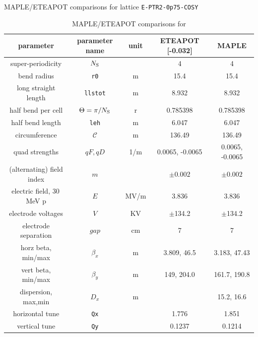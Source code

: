 \documentclass[]{article}
\begin{document}
\begin{table}[hbp]
\caption{\label{tbl:0p75}MAPLE/ETEAPOT comparisons for 
lattice {\tt E-PTR2-0p75-COSY}} 
\medskip
\centering
\begin{tabular}{|c|c|c|c|c|}           \hline
parameter            & parameter name         & unit & ETEAPOT [-0.032] &    MAPLE      \\ \hline
super-periodicity    &  $N_{\rm S}$            &      &      4        &       4       \\
bend radius          &  {\tt r0}              &  m   &    15.4      &    15.4       \\
long straight length &  {\tt llstot}          &  m   &   8.932      &  8.932        \\
half bend per cell   &  $\Theta=\pi/N_{\rm S}$ &  r    &  0.785398    & 0.785398      \\
half bend length     & {\tt leh}              &  m   &   6.047      &  6.047        \\
circumference        & $\mathcal{C}$          &  m   & 136.49       & 136.49         \\
quad strengths       & $qF,qD$                & 1/m  & 0.0065, -0.0065 & 0.0065, -0.0065  \\ 
(alternating) field index &  $m$              &      &  $\pm0.002$  & $\pm0.002$    \\  \hline
electric field, 30\,MeV p& $E$                  & MV/m &  3.836       &  3.836       \\
electrode voltages   & $V$                    & KV   & $\pm$134.2   & $\pm$134.2  \\
electrode separation & $gap$                  & cm   &     7        &      7        \\  \hline
horz beta, min/max   & $\beta_x$              &  m   & 3.809, 46.5  & 3.183, 47.43  \\ 
vert beta, min/max   & $\beta_y$              &  m   &   149, 204.0 & 161.7, 190.8  \\ 
dispersion, max,min  & $D_x$                  &  m   &              &  15.2, 16.6    \\
horizontal tune      &  {\tt Qx}              &      &  1.776       &  1.851        \\ 
vertical tune        &  {\tt Qy}              &      &  0.1237      & 0.1214        \\
\hline
\end{tabular}
%
\caption{\label{tbl:1p0}MAPLE/ETEAPOT comparisons for 
}
\end{table}
\end{document}
